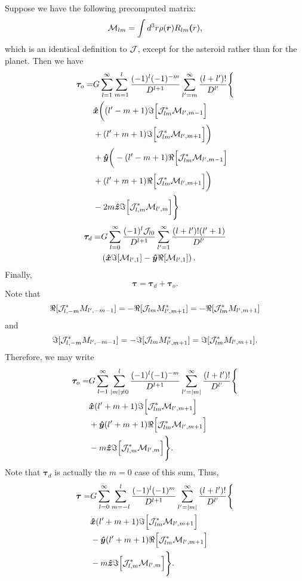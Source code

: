 \documentclass[aps,twocolumn,secnumarabic,balancelastpage,amsmath,amssymb,nofootinbib,floatfix]{revtex4-1}
\begin{document}
Suppose we have the following precomputed matrix:
$$\mathcal{M}_{lm} = \int d^3 r \rho(\bm r) R_{lm} \bm (r),$$
which is an identical definition to $\mathcal{J}$, except for the asteroid rather than for the planet. Then we have
\begin{equation*}
\begin{aligned}
\bm \tau_o = &G\sum_{l=1}^\infty \sum_{m=1}^l \frac{(-1)^l(-1)^{-m}}{D^{l+1}}\sum_{l'=m}^\infty \frac{(l+l')!}{D^{l'}}\Bigg\{\\
&\bm{\hat x}\bigg((l'-m+1)\Im\Big[\mathcal{J}^*_{lm} \mathcal{M}_{l',m-1}\Big]\\
&+(l'+m+1)\Im\Big[\mathcal{J}^*_{lm} \mathcal{M}_{l',m+1}\Big]\bigg)\\
&+\bm{\hat y}\bigg(-(l'-m+1)\Re\Big[\mathcal{J}^*_{lm} \mathcal{M}_{l',m-1}\Big]\\
&+(l'+m+1)\Re\Big[\mathcal{J}^*_{lm} \mathcal{M}_{l',m+1}\Big]\bigg)\\
&-2m\bm{\hat z}\Im\Big[\mathcal{J}_{l,m}^* \mathcal{M}_{l',m}\Big]\Bigg\}
\end{aligned}
\end{equation*}
\begin{equation*}
\begin{aligned}
\bm \tau_d = &G\sum_{l=0}^\infty  \frac{(-1)^l \mathcal{J}_{l0}}{D^{l+1}}\sum_{l'=1}^\infty \frac{(l+l')!(l'+1)}{D^{l'}}\\
& \left( \bm{\hat x}\Im [\mathcal{M}_{l',1}] - \bm{\hat y}\Re [\mathcal{M}_{l',1}] \right).
\end{aligned}
\end{equation*}
Finally,
$$\bm \tau = \bm\tau_d + \bm\tau_o.$$
Note that
$$\Re[\mathcal{J}_{l,-m}^* M_{l',-m-1}]=-\Re[\mathcal{J}_{lm} M^*_{l',m+1}]=-\Re[\mathcal{J}^*_{lm} M_{l',m+1}]$$
and
$$\Im[\mathcal{J}_{l,-m}^* M_{l',-m-1}]=-\Im[\mathcal{J}_{lm} M^*_{l',m+1}]=\Im[\mathcal{J}^*_{lm} M_{l',m+1}].$$
Therefore, we may write
\begin{equation*}
\begin{aligned}
\bm \tau_o = &G\sum_{l=1}^\infty \sum_{|m|\neq 0}^l \frac{(-1)^l(-1)^{-m}}{D^{l+1}}\sum_{l'=|m|}^\infty \frac{(l+l')!}{D^{l'}}\Bigg\{\\
&\bm{\hat x}(l'+m+1)\Im\Big[\mathcal{J}_{lm}^* \mathcal{M}_{l',m+1}\Big]\\
&+\bm{\hat y}(l'+m+1)\Re\Big[\mathcal{J}_{lm}^* \mathcal{M}_{l',m+1}\Big]\\
&-m\bm{\hat z}\Im\Big[\mathcal{J}_{l,m}^* \mathcal{M}_{l',m}\Big]\Bigg\}.
\end{aligned}
\end{equation*}
Note that $\bm \tau_d$ is actually the $m=0$ case of this sum,  Thus,
\begin{equation*}
\begin{aligned}
\bm \tau = &G\sum_{l=0}^\infty \sum_{m=-l}^l \frac{(-1)^l(-1)^{m}}{D^{l+1}}\sum_{l'=|m|}^\infty \frac{(l+l')!}{D^{l'}}\Bigg\{\\
&\bm{\hat x}(l'+m+1)\Im\Big[\mathcal{J}^*_{lm} \mathcal{M}_{l',m+1}\Big]\\
&-\bm{\hat y}(l'+m+1)\Re\Big[\mathcal{J}^*_{lm} \mathcal{M}_{l',m+1}\Big]\\
&-m\bm{\hat z}\Im\Big[\mathcal{J}_{l,m}^* \mathcal{M}_{l',m}\Big]\Bigg\}.
\end{aligned}
\end{equation*}
\end{document}
